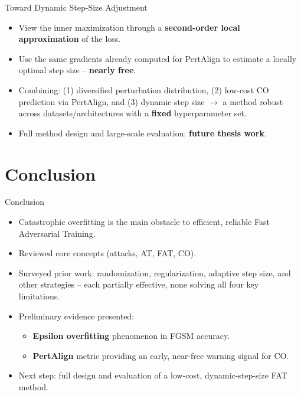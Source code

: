\documentclass[11pt,aspectratio=169]{beamer}
\begin{document}
\begin{frame}{Toward Dynamic Step-Size Adjustment}
  \begin{itemize}
    \item View the inner maximization through a \textbf{second-order local approximation} of the loss.
    \item Use the same gradients already computed for PertAlign to estimate a locally optimal step size -- \textbf{nearly free}.
    \item Combining: (1) diversified perturbation distribution, (2) low-cost CO prediction via PertAlign, and (3) dynamic step size $\rightarrow$ a method robust across datasets/architectures with a \textbf{fixed} hyperparameter set.
    \item Full method design and large-scale evaluation: \textbf{future thesis work}.
  \end{itemize}
\end{frame}

\section{Conclusion}

\begin{frame}{Conclusion}
  \begin{itemize}
    \item Catastrophic overfitting is the main obstacle to efficient, reliable Fast Adversarial Training.
    \item Reviewed core concepts (attacks, AT, FAT, CO).
    \item Surveyed prior work: randomization, regularization, adaptive step size, and other strategies -- each partially effective, none solving all four key limitations.
    \item Preliminary evidence presented:
    \begin{itemize}
      \item \textbf{Epsilon overfitting} phenomenon in FGSM accuracy.
      \item \textbf{PertAlign} metric providing an early, near-free warning signal for CO.
    \end{itemize}
    \item Next step: full design and evaluation of a low-cost, dynamic-step-size FAT method.
  \end{itemize}
\end{frame}
\end{document}

